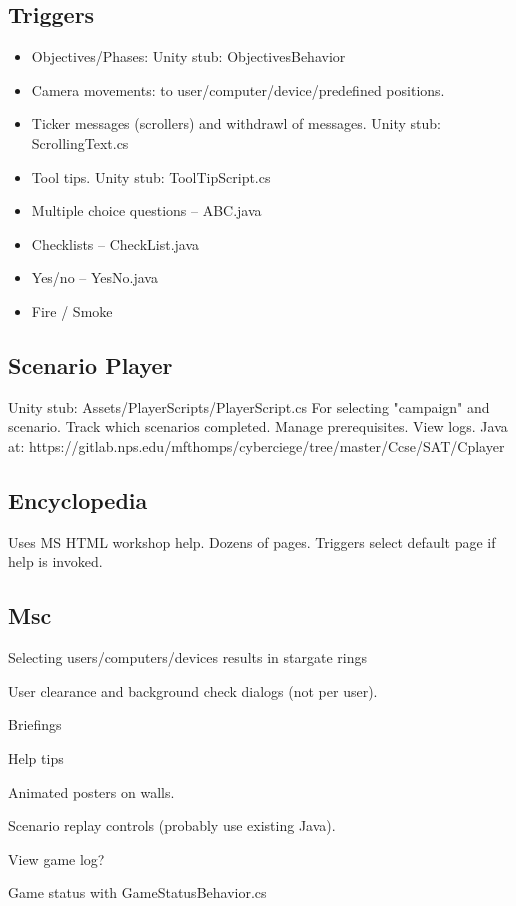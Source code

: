 \documentclass{article}
\begin{document}
\subsection{Triggers}
\begin{itemize}
\item Objectives/Phases: Unity stub: ObjectivesBehavior
\item Camera movements: to user/computer/device/predefined positions.
\item Ticker messages (scrollers) and withdrawl of messages. Unity stub: ScrollingText.cs
\item Tool tips.  Unity stub: ToolTipScript.cs
\item Multiple choice questions -- ABC.java
\item Checklists -- CheckList.java
\item Yes/no  -- YesNo.java
\item Fire / Smoke 
\end{itemize}

\subsection {Scenario Player}
\label{player}
Unity stub: Assets/PlayerScripts/PlayerScript.cs
For selecting "campaign" and scenario.  Track which scenarios completed.
Manage prerequisites.  View logs.
Java at:
https://gitlab.nps.edu/mfthomps/cyberciege/tree/master/Ccse/SAT/Cplayer

\subsection{Encyclopedia}
Uses MS HTML workshop help.  Dozens of pages.  Triggers select default page if help is invoked.
 
\subsection{Msc}
Selecting users/computers/devices results in stargate rings

User clearance and background check dialogs (not per user).

Briefings

Help tips

Animated posters on walls.

Scenario replay controls (probably use existing Java).

View game log?

Game status with GameStatusBehavior.cs
\end{document}
